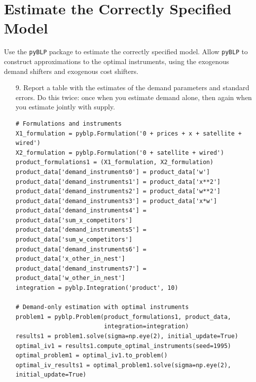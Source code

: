 \documentclass[english,11pt]{article}
\begin{document}
\section{Estimate the Correctly Specified Model}

Use the \texttt{pyBLP} package to estimate the correctly specified model. Allow
\texttt{pyBLP} to construct approximations to the optimal instruments, using the
exogenous demand shifters and exogenous cost shifters.

\begin{enumerate}
\item[9.] Report a table with the estimates of the demand
parameters and standard errors. Do this twice: once when you estimate demand
alone, then again when you estimate jointly with supply.

\begin{verbatim}
# Formulations and instruments
X1_formulation = pyblp.Formulation('0 + prices + x + satellite + wired')
X2_formulation = pyblp.Formulation('0 + satellite + wired')
product_formulations1 = (X1_formulation, X2_formulation)
product_data['demand_instruments0'] = product_data['w']
product_data['demand_instruments1'] = product_data['x**2']
product_data['demand_instruments2'] = product_data['w**2']
product_data['demand_instruments3'] = product_data['x*w']
product_data['demand_instruments4'] = product_data['sum_x_competitors']
product_data['demand_instruments5'] = product_data['sum_w_competitors']
product_data['demand_instruments6'] = product_data['x_other_in_nest']
product_data['demand_instruments7'] = product_data['w_other_in_nest']
integration = pyblp.Integration('product', 10)

# Demand-only estimation with optimal instruments
problem1 = pyblp.Problem(product_formulations1, product_data, 
                         integration=integration)
results1 = problem1.solve(sigma=np.eye(2), initial_update=True)
optimal_iv1 = results1.compute_optimal_instruments(seed=1995)
optimal_problem1 = optimal_iv1.to_problem()
optimal_iv_results1 = optimal_problem1.solve(sigma=np.eye(2), initial_update=True)


\end{verbatim}
\end{enumerate}
\end{document}
